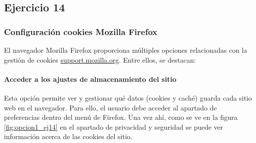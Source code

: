 \subsection{Ejercicio 14}
\graphicspath{ {img/14} }



\subsubsection{Configuración cookies Mozilla Firefox}

El navegador Mozilla Firefox proporciona múltiples opciones relacionadas con la gestión de cookies \url{support.mozilla.org}. Entre ellos, se destacan: 

\paragraph{Acceder a los ajustes de almacenamiento del sitio }

Esta opción permite ver y gestionar qué datos (cookies y caché) guarda cada sitio web en el navegador. Para ello, el usuario debe acceder al apartado de preferencias dentro del menú de Firefox. Una vez ahí, como se ve en la figura \ref{fig:opcion1_ej14} en el apartado de privacidad y seguridad se puede ver información acerca de las cookies del sitio.

